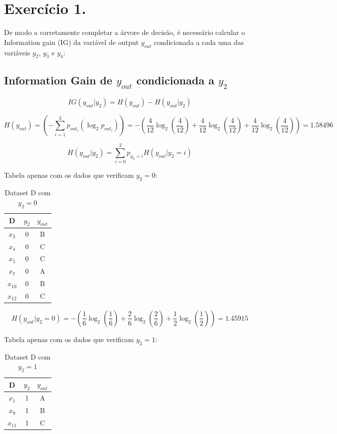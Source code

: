\documentclass{article}
\begin{document}
\section{Exercício 1.}

De modo a corretamente completar a árvore de decisão, é necessário calcular o Information gain (IG) da variável de output $y_{out}$ condicionada a cada uma das variáveis $y_2$, $y_3$ e $y_4$:

\subsection{Information Gain de $y_{out}$ condicionada a $y_2$}

\[ IG(y_{out}|y_2) = H(y_{out}) - H(y_{out}|y_2) \]

\[ H(y_{out}) = \left(- \sum_{i=1}^{3} p_{out_i} (\log_2 p_{out_i})\right) = - \left( \frac{4}{12} \log_2 \left( \frac{4}{12} \right) + \frac{4}{12} \log_2 \left( \frac{4}{12} \right) + \frac{4}{12} \log_2 \left( \frac{4}{12} \right) \right) = 1.58496 \]

\[ H(y_{out}|y_2) = \sum_{i=0}^{2} p_{y_2 = i} H(y_{out}|y_2 = i) \]

Tabela apenas com os dados que verificam $y_2 = 0$:

\begin{table}[h!]
\centering
\begin{tabular}{|c|c|c|}
\hline
    D     & $y_2$ & $y_{out}$ \\ \hline
    $x_3$ & 0     & B         \\ \hline
    $x_4$ & 0     & C         \\ \hline
    $x_5$ & 0     & C         \\ \hline
    $x_7$ & 0     & A         \\ \hline
    $x_{10}$ & 0     & B         \\ \hline
    $x_{12}$ & 0     & C         \\ \hline
\end{tabular}
\caption{Dataset D com $y_2 = 0$}
\label{tab:datasetDy2=0}
\end{table}

\[ H(y_{out}|y_2 = 0) = - \left( \frac{1}{6} \log_2 \left( \frac{1}{6} \right) + \frac{2}{6} \log_2 \left( \frac{2}{6} \right) + \frac{1}{2} \log_2 \left( \frac{1}{2} \right) \right) = 1.45915 \]

Tabela apenas com os dados que verificam $y_2 = 1$:

\begin{table}[h!]
\centering
\begin{tabular}{|c|c|c|}
\hline
    D     & $y_2$ & $y_{out}$ \\ \hline
    $x_1$ & 1     & A         \\ \hline
    $x_9$ & 1     & B         \\ \hline
    $x_{11}$ & 1     & C         \\ \hline
\end{tabular}
\caption{Dataset D com $y_2 = 1$}
\label{tab:datasetDy2=1}
\end{table}
\end{document}
